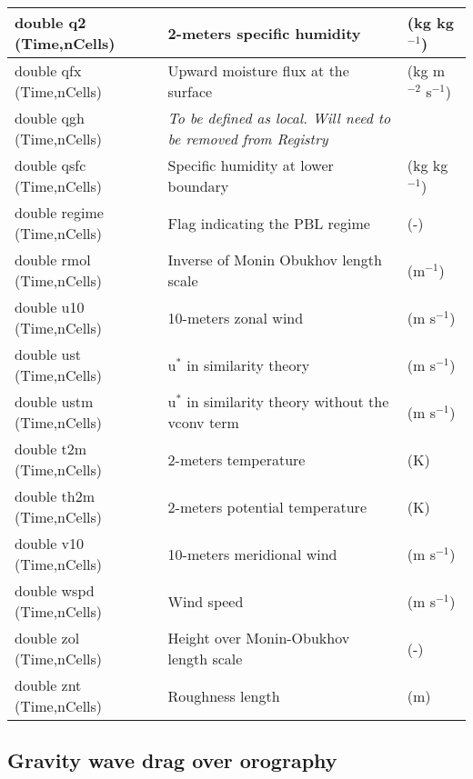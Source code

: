 {\begin{longtable}{|p{2.0in} |p{3.0in} |p{1.0in} |}
double q2 (Time,nCells) & 2-meters specific humidity & (kg kg$^{-1}$) \\ \hline
double qfx (Time,nCells) & Upward moisture flux at the surface & (kg m$^{-2}$ s$^{-1}$) \\ \hline
double qgh (Time,nCells) & \em{To be defined as local. Will need to be removed from Registry} & \\ \hline
double qsfc (Time,nCells) & Specific humidity at lower boundary & (kg kg$^{-1}$) \\ \hline
double regime (Time,nCells) & Flag indicating the PBL regime & (-) \\ \hline
double rmol (Time,nCells) & Inverse of Monin Obukhov length scale & (m$^{-1}$) \\ \hline
double u10 (Time,nCells) & 10-meters zonal wind & (m s$^{-1}$) \\ \hline
double ust (Time,nCells) & u$^{*}$ in similarity theory & (m s$^{-1}$) \\ \hline
double ustm (Time,nCells) & u$^{*}$ in similarity theory without the vconv term & (m s$^{-1}$) \\ \hline
double t2m (Time,nCells) & 2-meters temperature & (K) \\ \hline
double th2m (Time,nCells) & 2-meters potential temperature & (K) \\ \hline
double v10 (Time,nCells) & 10-meters meridional wind & (m s$^{-1}$) \\ \hline
double wspd (Time,nCells) & Wind speed & (m s$^{-1}$) \\ \hline
double zol (Time,nCells) & Height over Monin-Obukhov length scale & (-) \\ \hline
double znt (Time,nCells) & Roughness length & (m) \\ \hline
\end{longtable}
}

\subsection{Gravity wave drag over orography}

